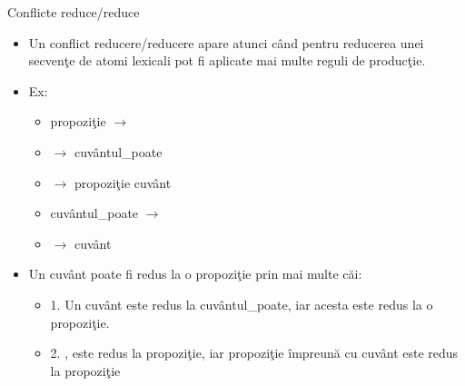 \documentclass[pdf]{beamer}
\begin{document}
\begin{frame}{Conflicte reduce/reduce}
\begin{itemize}
	\item
	Un conflict reducere/reducere apare atunci când pentru reducerea unei secvenţe de atomi lexicali pot fi aplicate mai multe reguli de producţie.

	\item
	Ex:

	\begin{itemize}
		\item[]
		propoziţie  $\rightarrow$  \textepsilon

		\item[]
		\hspace{1.45cm}  $\rightarrow$  cuvântul\_poate

		\item[]
		\hspace{1.45cm}  $\rightarrow$  propoziţie cuvânt
	
		\item[]
		cuvântul\_poate  $\rightarrow$  \textepsilon

		\item[]
		\hspace{2.35cm}  $\rightarrow$  cuvânt

	\end{itemize}

	\item
	Un cuvânt poate fi redus la o propoziţie prin mai multe căi:

	\begin{itemize}
		\item[]
		1. Un cuvânt este redus la cuvântul\_poate, iar acesta este redus la o propoziţie.

		\item[]
		2. \textepsilon,  este redus la propoziţie, iar propoziţie împreună cu cuvânt este redus la propoziţie
	\end{itemize}

\end{itemize}
\end{frame}
\end{document}
